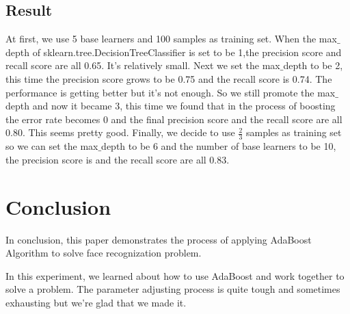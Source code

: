 \documentclass[journal, a4paper]{IEEEtran}
\begin{document}
\subsection{Result}
At first, we use 5 base learners and 100 samples as training set. When the max$\_$depth of sklearn.tree.DecisionTreeClassifier is set to be 1,the precision score and recall score are all 0.65. It's relatively small. Next we set the max$\_$depth to be 2, this time the precision score grows to be 0.75 and the recall score is 0.74. The performance is getting better but it's not enough.
So we still promote the max$\_$depth and now it became 3, this time we found that in the process of boosting the error rate becomes 0 and the final precision score and the recall score are all 0.80. This seems pretty good.
Finally, we decide to use $\frac{2}{3}$ samples as training set so we can set the max$\_$depth to be 6 and the number of base learners to be 10, the precision score is and the recall score are all 0.83.
\section{Conclusion}
	In conclusion, this paper demonstrates the process of applying AdaBoost Algorithm to solve face recognization problem. 
	\par In this experiment, we learned about how to use AdaBoost and work together to solve a problem. The parameter adjusting process is quite tough and sometimes exhausting but we're glad that we made it.


\end{document}
